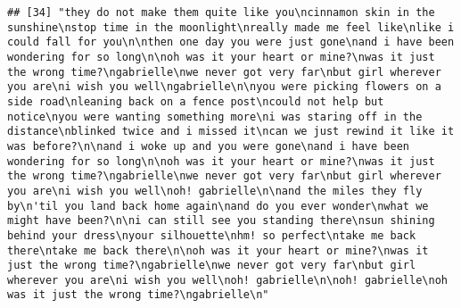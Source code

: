 \documentclass[]{article}
\begin{document}
\begin{verbatim}
## [34] "they do not make them quite like you\ncinnamon skin in the sunshine\nstop time in the moonlight\nreally made me feel like\nlike i could fall for you\n\nthen one day you were just gone\nand i have been wondering for so long\n\noh was it your heart or mine?\nwas it just the wrong time?\ngabrielle\nwe never got very far\nbut girl wherever you are\ni wish you well\ngabrielle\n\nyou were picking flowers on a side road\nleaning back on a fence post\ncould not help but notice\nyou were wanting something more\ni was staring off in the distance\nblinked twice and i missed it\ncan we just rewind it like it was before?\n\nand i woke up and you were gone\nand i have been wondering for so long\n\noh was it your heart or mine?\nwas it just the wrong time?\ngabrielle\nwe never got very far\nbut girl wherever you are\ni wish you well\noh! gabrielle\n\nand the miles they fly by\n'til you land back home again\nand do you ever wonder\nwhat we might have been?\n\ni can still see you standing there\nsun shining behind your dress\nyour silhouette\nhm! so perfect\ntake me back there\ntake me back there\n\noh was it your heart or mine?\nwas it just the wrong time?\ngabrielle\nwe never got very far\nbut girl wherever you are\ni wish you well\noh! gabrielle\n\noh! gabrielle\noh was it just the wrong time?\ngabrielle\n"                                                                                                                                                                                                                                                                                                                                                                                                                                                                                                                                                                                                                                                                                                                                                                                                                                                                                                                                                                                                                                                                                                                                                                                                                                                                                                                                                                                                                                                                                                                                                                                                                

\end{verbatim}
\end{document}
